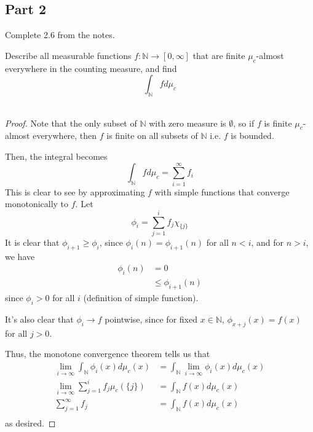 \documentclass[fontsize=11pt]{scrartcl} %
\numberwithin{equation}{section} %
\numberwithin{figure}{section} %
\numberwithin{table}{section} %
\newcommand{\N}{\mathbb{N}}
\begin{document}
\subsection*{Part 2}
Complete 2.6 from the notes.

Describe all measurable functions $f:\N\to[0,\infty]$ that are finite $\mu_c$-almost everywhere in
the counting measure, and find
\[
\int_{\N} f d\mu_c
\]
\\
\begin{proof}
Note that the only subset of $\N$ with zero measure is $\emptyset$, so if $f$ is finite
$\mu_c$-almost everywhere, then $f$ is finite on all subsets of $\N$ i.e. $f$ is bounded.

Then, the integral becomes
\[
\int_{\N} f d\mu_c = \sum_{i=1}^{\infty} f_i
\]
This is clear to see by approximating $f$ with simple functions that converge monotonically
to $f$. Let 
\[
\phi_i = \sum_{j=1}^{i}f_j \chi_{\{j\}}
\]
It is clear that $\phi_{i+1}\geq\phi_i$, since $\phi_i(n) = \phi_{i+1}(n)$ for all $n<i$,
and for $n>i$, we have
\[
\begin{aligned}
\phi_i(n)&=0\\
        &\leq\phi_{i+1}(n)
\end{aligned}
\]
since $\phi_i > 0$ for all $i$ (definition of simple function).

It's also clear that $\phi_i\to f$ pointwise, since for fixed $x\in\N$, $\phi_{x+j}(x)=f(x)$
for all $j>0$.

Thus, the monotone convergence theorem tells us that
\[
\begin{aligned}
\lim_{i\to\infty}\int_{\N}\phi_i(x)d\mu_c(x) &= \int_{\N} \lim_{i\to\infty}\phi_i(x)d\mu_c(x)\\
\lim_{i\to\infty}\sum_{j=1}^{i}f_j \mu_c(\{j\}) &= \int_{\N} f(x) d\mu_c(x)\\
\sum_{j=1}^{\infty} f_j &= \int_{\N} f(x)d\mu_c(x)\\
\end{aligned}
\]
as desired.
\end{proof}
\end{document}
